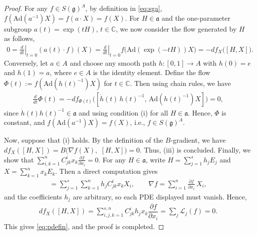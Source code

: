 \documentclass[11pt,reqno]{amsart}
\newtheorem*{theorem A}{Main Theorem A}
\newtheorem*{theorem B}{Main Theorem B}
\newtheorem*{theorem C}{Main Theorem C}
\newtheorem*{theorem D}{Main Theorem D}
\theoremstyle{definition}
\theoremstyle{plain}
\theoremstyle{conclusion}
\begin{document}
\begin{proof}
For any $f \in S(\mathfrak{g})^A$, by definition in \eqref{eq:sga}, $f(\mathrm{Ad}(a^{-1})X) = f(a \cdot X) = f(X)$.  For $H\in\mathfrak{a}$ and the one-parameter subgroup $a(t)=\exp(tH)$, $t \in \mathbb{C}$, we now consider the flow generated by $H$ as follows, \begin{align*}
0=\left.\frac{d}{dt}\right\vert_{t = 0}(a(t) \cdot  f)(X) =\left.\frac{d}{dt}\right\vert_{t = 0}f\big(\mathrm{Ad}(\exp(-tH))X\big)=- df_X \big([H,X]\big).
\end{align*}  Conversely, let $a\in A$ and choose any smooth path $h:[0,1]\to A$ with $h(0)=e$ and $h(1)=a$, where $e \in A$ is the identity element. Define the flow $\Phi(t):=f(\mathrm{Ad}(h(t)^{-1})X)$ for $t \in \mathbb{C}$. Then using chain rules, we have
\begin{align*}
\frac{d}{dt}\Phi(t) =- df_{\Phi(t)} \Big(\left[\dot{h}(t)\,h(t)^{-1},\,\mathrm{Ad}(h(t)^{-1})X\right]\Big)=0,
\end{align*} since $\dot{h}(t)h(t)^{-1}\in\mathfrak{a}$ and using condition (i) for all $H\in\mathfrak{a}$. Hence, $\Phi$ is constant, and $f(\mathrm{Ad}(a^{-1})X)=f(X)$, i.e., $f\in S(\mathfrak{g})^A$.

Now, suppose that (i) holds. By the definition of the $B$-gradient, we have $df_X([H,X]) = B ( \nabla f(X),$ $[H,X] )=0$. Thus, (iii) is concluded.  Finally, we show that $\sum_{i,k=1}^n  C_{jk}^i x_k \frac{\partial f}{\partial x_i}=0 $. For any $H \in \mathfrak{a}$, write $H=\sum_{j=1}^s h_j E_j$ and $X=\sum_{k=1}^n x_k E_k$. Then a direct computation gives \begin{align*}
[H,X]=\sum_{j=1}^s\sum_{k=1}^n h_j C_{jk}^i x_k  X_i,\qquad \nabla f=\sum_{i=1}^n\frac{\partial f}{\partial x_i}\,X_i,
\end{align*} and the coefficients $h_j$ are arbitrary, so each PDE displayed must vanish. Hence, \begin{align*}
    d f_X([H,X]) =  \sum_{i,j,k=1}^{s,n} C_{jk}^i h_j x_k \dfrac{\partial f}{\partial x_i} = \sum_j \mathcal{L}_j(f) = 0.
\end{align*} This gives \eqref{eq:pdefin}, and the proof is completed.
\end{proof}
\end{document}
